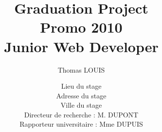 \documentclass[12pt,a4paper,utf8x,twoside,openright]{report}
\title
{
	\normalsize{Graduation Project}\\Promo 2010\\
	\vspace{15mm}
	\Huge{Junior Web Developer}
}
\author{Thomas LOUIS\\
	\vspace{45mm}
}
\date{	
	\normalsize{Lieu du stage\\
	Adresse du stage\\
	Ville du stage\\ 
	\vspace{5mm}	
	Directeur de recherche : M. DUPONT \\
	Rapporteur universitaire : Mme DUPUIS
	}
}
\begin{document}
\maketitle



\tableofcontents
\listoffigures
\listoftables
\clearpage

\begin{onehalfspace}



%









\end{onehalfspace}

\nocite{MotClef1}
\nocite{MotClef2}
\nocite{MotClef3}
\nocite{MotClef4}
\nocite{MotClef5}


\printindex
\appendix
%
%
%

%
\end{document}
